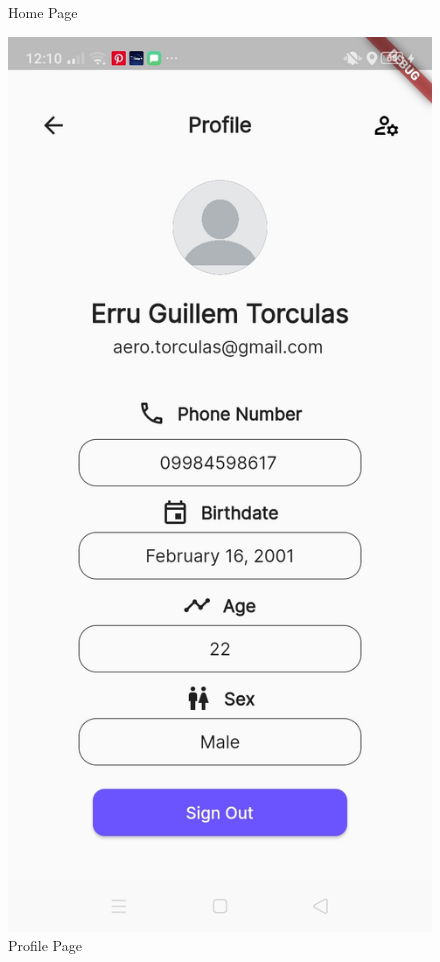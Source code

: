 \begin{figure}[!h]
\begin{minipage}[c]{0.40\linewidth}
        \caption{Home Page}
        \label{fig:userHome}
    \end{minipage}
    \centering
    \begin{minipage}[c]{0.40\linewidth}
        \centering
        \includegraphics[scale=0.15]{figures/Chapter4/Main/Profile.jpg}
        \caption{Profile Page}
        \label{fig:userProfile}
    \end{minipage}
\end{figure}
